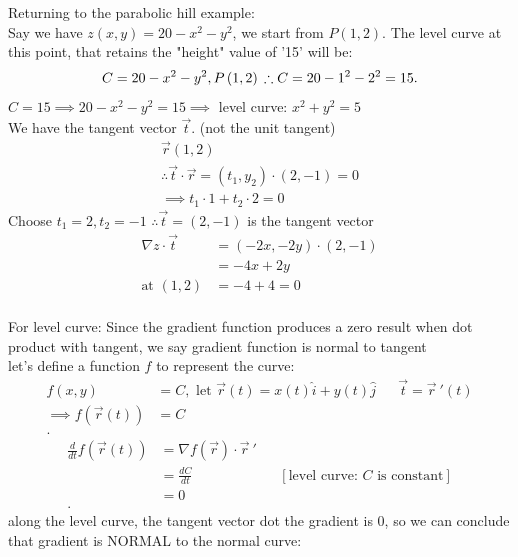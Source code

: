 \begin{itemize}
\begin{example}
	Returning to the parabolic hill example: \\
	Say we have $z\left( x,y \right)  = 20 - x^2 - y^2$, we start from $P\left( 1,2 \right) $. The level curve at this point, that retains the "height" value of '15' will be:
	\[
	 C = 20-x^2 - y^2, P\left( 1,2 \right) \\
	 \therefore  C = 20-1^2-2^2 = 15
	.\] 
	$C = 15 \implies 20 - x^2 - y^2 = 15 \implies$ level curve: $x^2 + y^2 =5$ \\
	We have the tangent vector $\vec{t}$. (not the unit tangent)
	\begin{align*}
		\vec{r}\left( 1,2 \right)  \\
		\therefore  \vec{t} \cdot  \vec{r} = \left( t_1,y_2 \right) \cdot  \left(2,-1  \right)  =  0 \\
		\implies t_1\cdot 1+t_2 \cdot 2 = 0
	\end{align*}
	Choose $t_1 = 2, t_2 = -1$ $\therefore \vec{t} = \left( 2,-1 \right) $ is the tangent vector
	\begin{align*}
		\nabla z \cdot  \vec{t} &=  \left( -2x, -2y \right)  \cdot  \left( 2,-1 \right)  \\
	&= -4x + 2y \\
	\text{at }\left( 1,2 \right)  &=  -4+4 = 0 \\
	\end{align*}
\end{example}
\begin{theorem}
	For level curve: Since the gradient function produces a zero result when dot product with tangent, we say gradient function is normal to tangent\\
	let's define a function $f$ to represent the curve:
	 \begin{align*}
		 f\left( x,y \right)  &= C, \text{ let }\vec{r}\left( t \right)  = x\left( t \right) \hat{i} + y\left( t \right) \hat{j} && \vec{t} = \vec{r}~'\left( t \right) \\
		\implies f\left( \vec{r}\left( t \right)  \right)  &=  C \\
	.\end{align*}
	\begin{align*}
		\frac{d}{dt}f\left( \vec{r}\left( t \right)  \right)  &=  \nabla f\left( \vec{r} \right)  \cdot  \vec{r}~' \\
															  &= \frac{dC}{dt} && [\text{level curve: $C$ is constant}]\\
		&= 0 \\
	.\end{align*}
	along the level curve, the tangent vector dot the gradient is 0, so we can conclude that gradient is NORMAL to the normal curve:

\end{theorem}
\end{itemize}
